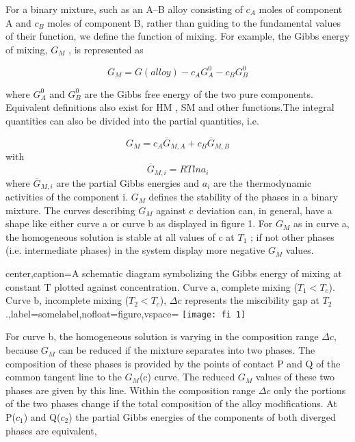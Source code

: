 \documentclass[12pt]{article}
\newcommand*{\1}{\hspace{1pt}}
\begin{document}
        For a binary mixture, such as an A–B alloy consisting of $c_A$ moles of component A and $c_B$
        moles of component B, rather than guiding to the fundamental values of their function, 
        we define the function of mixing. For example, the Gibbs energy of mixing, $G_M$ , is represented as

        \begin{equation}
            G_M = G(alloy) - c_A G^{0}_{A} - c_B G^{0}_{B}
        \end{equation}

    where $G ^{0}_{A}$ and $G ^{0}_{B}$ are the Gibbs free energy of the two pure components. Equivalent
    definitions also exist for HM , SM and other functions.The integral quantities can also be divided 
    into the partial quantities, i.e.

        \begin{equation}
            G_M = c_A \overline{G} _{M,A} + c_B \overline{G} _{M,B}
        \end{equation}
    with
        \begin{equation}
            \overline{G} _{M,i} = RT ln a_i                \tag*{( i= A,B )}
        \end{equation}
    where  $\overline{G} _{M,i} $ are the partial Gibbs energies and $a _{i}$ are the thermodynamic 
    activities of the component i.
    $G _M$ defines the stability of the phases in a binary mixture. The curves describing
    $G _M$ against c deviation can, in general, have a shape like either curve a or curve b as displayed
    in figure 1.\cite{s3} For $G _M$ as in curve a, the homogeneous solution is stable at all values of c at
    $T _1$ ; if not other phases (i.e. intermediate phases) in the system display more negative $G _M$
    values.


        
    \begin{adjustbox}{center,caption={A schematic diagram symbolizing the Gibbs energy of mixing at constant T plotted against concentration. 
        Curve a, complete mixing ($ T _1 < T _c $). 
        Curve b, incomplete mixing ($ T _2 < T _c $), 
        $\Delta c$ represents the miscibility gap at $ T _2$ .},label={somelabel},nofloat=figure,vspace=\bigskipamount}
        \texttt{[image: fi 1]}
    \end{adjustbox}
        

        For curve b, the homogeneous solution is varying in the composition range $\Delta c$, because
    $G _M$ can be reduced if the mixture separates into two phases. The composition of these phases
    is provided by the points of contact P and Q of the common tangent line to the $G _M$(c) curve.
    The reduced $G _M$  values of these two phases are given by this line. Within the composition
    range $\Delta c$ only the portions of the two phases change if the total composition of the alloy
    modifications. At P($c _1$) and Q($c _2$) the partial Gibbs energies of the components of both diverged
    phases are equivalent,
\end{document}
